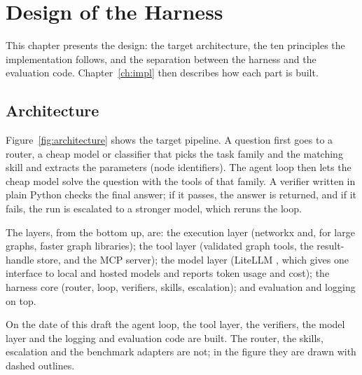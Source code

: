 \chapter{Design of the Harness}
\label{ch:design}

This chapter presents the design: the target architecture, the ten principles the implementation follows, and the
separation between the harness and the evaluation code. Chapter~\ref{ch:impl} then describes how each part is built.

\section{Architecture}

Figure~\ref{fig:architecture} shows the target pipeline. A question first goes to a router, a cheap model or
classifier that picks the task family and the matching skill and extracts the parameters (node identifiers). The
agent loop then lets the cheap model solve the question with the tools of that family. A verifier written in plain
Python checks the final answer; if it passes, the answer is returned, and if it fails, the run is escalated to a
stronger model, which reruns the loop.

The layers, from the bottom up, are: the execution layer (networkx and, for large graphs, faster graph libraries); the
tool layer (validated graph tools, the result-handle store, and the MCP server); the model layer (LiteLLM
\cite{litellm}, which gives one interface to local and hosted models and reports token usage and cost); the harness
core (router, loop, verifiers, skills, escalation); and evaluation and logging on top.

On the date of this draft the agent loop, the tool layer, the verifiers, the model layer and the logging and
evaluation code are built. The router, the skills, escalation and the benchmark adapters are not; in the figure they
are drawn with dashed outlines.


